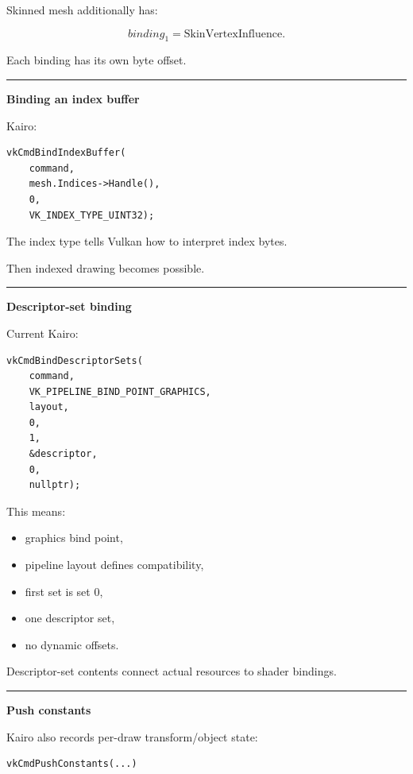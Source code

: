Skinned mesh additionally has:

\[
binding_1=\text{SkinVertexInfluence}.
\]

Each binding has its own byte offset.

\begin{center}\rule{0.5\linewidth}{0.5pt}\end{center}

\textbf{Binding an index buffer}

Kairo:

\begin{verbatim}
vkCmdBindIndexBuffer(
    command,
    mesh.Indices->Handle(),
    0,
    VK_INDEX_TYPE_UINT32);
\end{verbatim}

The index type tells Vulkan how to interpret index bytes.

Then indexed drawing becomes possible.

\begin{center}\rule{0.5\linewidth}{0.5pt}\end{center}

\textbf{Descriptor-set binding}

Current Kairo:

\begin{verbatim}
vkCmdBindDescriptorSets(
    command,
    VK_PIPELINE_BIND_POINT_GRAPHICS,
    layout,
    0,
    1,
    &descriptor,
    0,
    nullptr);
\end{verbatim}

This means:

\begin{itemize}
\tightlist
\item
  graphics bind point,
\item
  pipeline layout defines compatibility,
\item
  first set is set 0,
\item
  one descriptor set,
\item
  no dynamic offsets.
\end{itemize}

Descriptor-set contents connect actual resources to shader bindings.

\begin{center}\rule{0.5\linewidth}{0.5pt}\end{center}

\textbf{Push constants}

Kairo also records per-draw transform/object state:

\begin{verbatim}
vkCmdPushConstants(...)
\end{verbatim}

